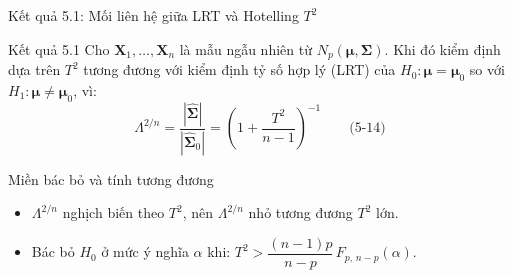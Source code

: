 \begin{frame}{Kết quả 5.1: Mối liên hệ giữa LRT và Hotelling \texorpdfstring{$T^2$}{T2}}
  \begin{block}{Kết quả 5.1}
    Cho $\mathbf{X}_1, \dots, \mathbf{X}_n$ là mẫu ngẫu nhiên từ $N_p(\boldsymbol{\mu}, \boldsymbol{\Sigma})$. Khi đó kiểm định dựa trên $T^2$ tương đương với kiểm định tỷ số hợp lý (LRT) của $H_0: \boldsymbol{\mu} = \boldsymbol{\mu}_0$ so với $H_1: \boldsymbol{\mu} \neq \boldsymbol{\mu}_0$, vì:
    \vspace{-4pt}
    \[
      \Lambda^{2/n} = \frac{|\hat{\boldsymbol{\Sigma}}|}{|\hat{\boldsymbol{\Sigma}}_0|} = \left( 1 + \frac{T^2}{n-1} \right)^{-1}
      \qquad \text{(5-14)}
    \]
  \end{block}

  \begin{alertblock}{Miền bác bỏ và tính tương đương}
    \begin{itemize}
      \item $\Lambda^{2/n}$ nghịch biến theo $T^2$, nên $\Lambda^{2/n}$ nhỏ tương đương $T^2$ lớn.
      \item Bác bỏ $H_0$ ở mức ý nghĩa $\alpha$ khi:
      $T^2 > \dfrac{(n-1)p}{n-p}\, F_{p,\,n-p}(\alpha)$.
    \end{itemize}
  \end{alertblock}
\end{frame}

